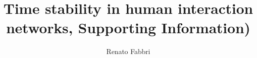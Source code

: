 \documentclass[%
	aip,
	jmp,%
	amsmath,amssymb,
	reprint,%
	floatfix,
]{revtex4-1}
\begin{document}


\title[Interaction networks stability: Supporting Information]{Time stability in human interaction networks, Supporting Information)}%

							\author{Renato Fabbri}%


\end{document}
